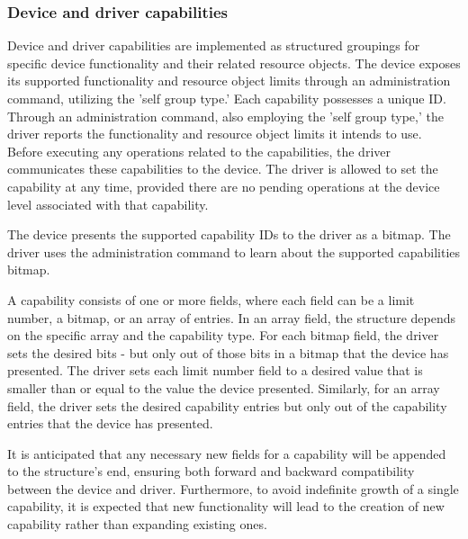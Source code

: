 \subsubsection{Device and driver capabilities}\label{sec:Basic Facilities of a Virtio Device / Device groups / Group administration commands / Device and driver capabilities}

Device and driver capabilities are implemented as structured groupings for
specific device functionality and their related resource objects. The device exposes
its supported functionality and resource object limits through an administration
command, utilizing the 'self group type.' Each capability possesses a
unique ID. Through an administration command, also employing the
'self group type,' the driver reports the functionality and
resource object limits it intends to use. Before executing any operations
related to the capabilities, the driver communicates these
capabilities to the device. The driver is allowed to set the
capability at any time, provided there are no pending operations
at the device level associated with that capability.

The device presents the supported capability IDs to the driver as a bitmap.
The driver uses the administration command to learn about the
supported capabilities bitmap.

A capability consists of one or more fields, where each field can be a
limit number, a bitmap, or an array of entries. In an array field,
the structure depends on the specific array and the capability type.
For each bitmap field, the driver sets the desired bits - but only out of
those bits in a bitmap that the device has presented.
The driver sets each limit number field to a desired value that
is smaller than or equal to the value the device presented.
Similarly, for an array field, the driver sets the desired capability
entries but only out of the capability entries that the device has presented.

It is anticipated that any necessary new fields for a capability will be
appended to the structure's end, ensuring both forward and backward
compatibility between the device and driver. Furthermore, to avoid
indefinite growth of a single capability, it is expected that new
functionality will lead to the creation of new capability rather
than expanding existing ones.
